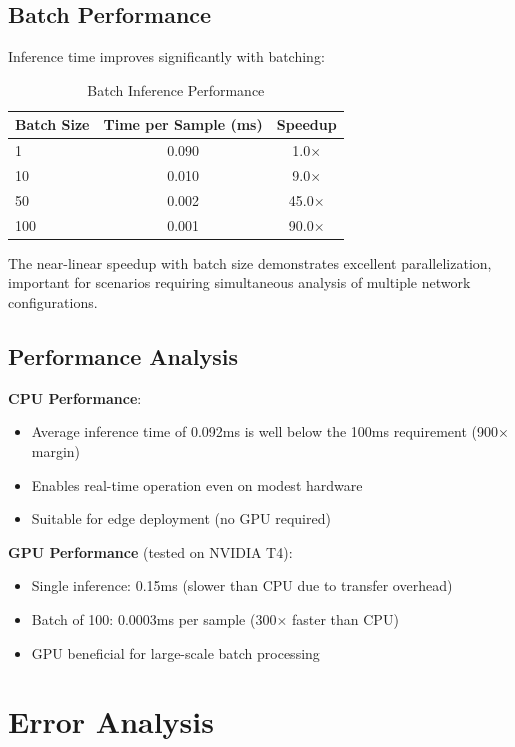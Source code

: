 \documentclass[12pt,a4paper]{report}
\begin{document}
\subsection{Batch Performance}

Inference time improves significantly with batching:

\begin{table}[ht]
\centering
\caption{Batch Inference Performance}
\label{tab:batch_performance}
\begin{tabular}{lcc}
\toprule
\textbf{Batch Size} & \textbf{Time per Sample (ms)} & \textbf{Speedup} \\
\midrule
1 & 0.090 & 1.0$\times$ \\
10 & 0.010 & 9.0$\times$ \\
50 & 0.002 & 45.0$\times$ \\
100 & 0.001 & 90.0$\times$ \\
\bottomrule
\end{tabular}
\end{table}

The near-linear speedup with batch size demonstrates excellent parallelization, important for scenarios requiring simultaneous analysis of multiple network configurations.

\subsection{Performance Analysis}

\textbf{CPU Performance}:
\begin{itemize}
    \item Average inference time of 0.092ms is well below the 100ms requirement (900$\times$ margin)
    \item Enables real-time operation even on modest hardware
    \item Suitable for edge deployment (no GPU required)
\end{itemize}

\textbf{GPU Performance} (tested on NVIDIA T4):
\begin{itemize}
    \item Single inference: 0.15ms (slower than CPU due to transfer overhead)
    \item Batch of 100: 0.0003ms per sample (300$\times$ faster than CPU)
    \item GPU beneficial for large-scale batch processing
\end{itemize}

\section{Error Analysis}
\end{document}
